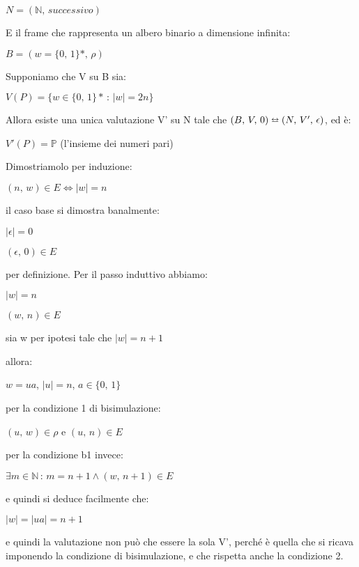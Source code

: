$N=(\mathbb{N},\, successivo)$

E il frame che rappresenta un albero binario a dimensione infinita:

$B=(w=\{0,\,1\}*,\,\rho)$

Supponiamo che V su B sia: 

$V(P)=\{w\in\{0,\,1\}*\,:\,|w|=2n\}$

Allora esiste una unica valutazione V' su N tale che $(B,\, V,\,0)\leftrightarroweq(N,\, V',\,\epsilon)$,
ed è:

$V'(P)=\mathbb{P}$ (l'insieme dei numeri pari)

Dimostriamolo per induzione:

$(n,\, w)\in E\iff|w|=n$

il caso base si dimostra banalmente:

$|\epsilon|=0$

$(\epsilon,\,0)\in E$

per definizione. Per il passo induttivo abbiamo:

$|w|=n$

$(w,\, n)\in E$

sia w per ipotesi tale che $|w|=n+1$

allora:

$w=ua$, $|u|=n$, $a\in\{0,\,1\}$

per la condizione 1 di bisimulazione:

$(u,\, w)\in\rho$ e $(u,\, n)\in E$

per la condizione b1 invece:

$\exists m\in\mathbb{N}\,:\, m=n+1\wedge(w,\, n+1)\in E$

e quindi si deduce facilmente che:

$|w|=|ua|=n+1$

e quindi la valutazione non può che essere la sola V', perché è quella
che si ricava imponendo la condizione di bisimulazione, e che rispetta
anche la condizione 2.

